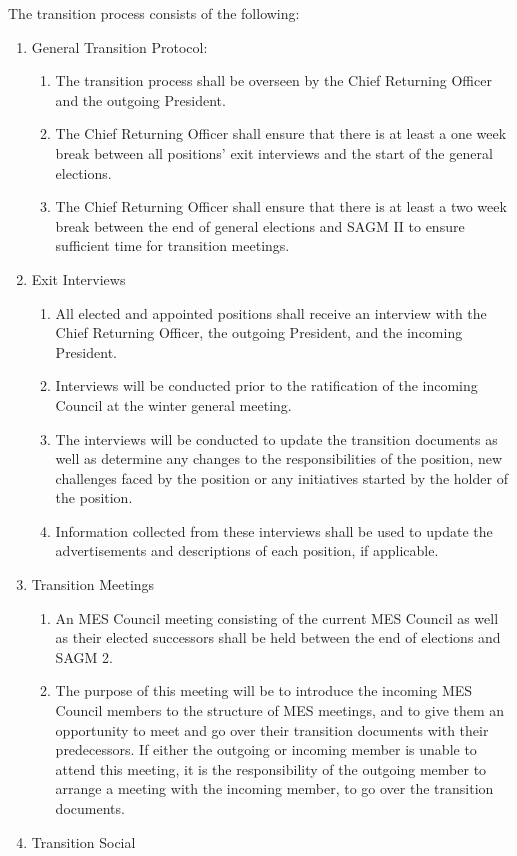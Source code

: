 The transition process consists of the following:

\begin{enumerate}
 \item
  General Transition Protocol:

  \begin{enumerate}
   \item
    The transition process shall be overseen by the Chief Returning
    Officer and the outgoing President.
   \item
    The Chief Returning Officer shall ensure that there is at least a
    one week break between all positions' exit interviews and the start
    of the general elections.
   \item
    The Chief Returning Officer shall ensure that there is at least a
    two week break between the end of general elections and SAGM II to
    ensure sufficient time for transition meetings.
  \end{enumerate}
 \item
  Exit Interviews

  \begin{enumerate}
   \item
    All elected and appointed positions shall receive an interview with
    the Chief Returning Officer, the outgoing President, and the
    incoming President.
   \item
    Interviews will be conducted prior to the ratification of the
    incoming Council at the winter general meeting.
   \item
    The interviews will be conducted to update the transition documents
    as well as determine any changes to the responsibilities of the
    position, new challenges faced by the position or any initiatives
    started by the holder of the position.
   \item
    Information collected from these interviews shall be used to update
    the advertisements and descriptions of each position, if applicable.
  \end{enumerate}
 \item
  Transition Meetings

  \begin{enumerate}
   \item
    An MES Council meeting consisting of the current MES Council as well
    as their elected successors shall be held between the end of
    elections and SAGM 2.
   \item
    The purpose of this meeting will be to introduce the incoming MES
    Council members to the structure of MES meetings, and to give them
    an opportunity to meet and go over their transition documents with
    their predecessors. If either the outgoing or incoming member is
    unable to attend this meeting, it is the responsibility of the
    outgoing member to arrange a meeting with the incoming member, to go
    over the transition documents.
  \end{enumerate}
 \item
  Transition Social


\end{enumerate}
